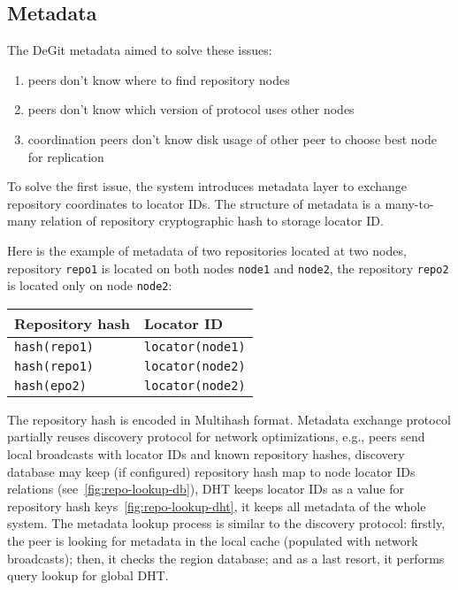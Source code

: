 \documentclass[acmlarge, screen, nonacm, 11pt]{acmart}
\newcommand{\code}[1]{\texttt{#1}}
\begin{document}
\subsection{Metadata}\label{sec:metadata}

The DeGit metadata aimed to solve these issues:
\begin{enumerate}
  \item peers don't know where to find repository nodes
  \item peers don't know which version of protocol uses other nodes
  \item coordination peers don't know disk usage of other peer to choose
    best node for replication
\end{enumerate}

To solve the first issue, the system introduces metadata layer to
exchange repository coordinates to locator IDs. The structure
of metadata is a many-to-many relation of
repository cryptographic hash to storage locator ID.

Here is the example of metadata of two repositories located at two nodes,
repository \code{repo1} is located on both nodes \code{node1} and \code{node2},
the repository \code{repo2} is located only on node \code{node2}:

\begin{tabular}{l | l}
  Repository hash & Locator ID \\ \hline
  \code{hash(repo1)} & \code{locator(node1)} \\
  \code{hash(repo1)} & \code{locator(node2)} \\
  \code{hash(epo2)} & \code{locator(node2)} \\
\end{tabular}

The repository hash is encoded in Multihash format. Metadata exchange
protocol partially reuses discovery protocol for network optimizations,
e.g., peers send local broadcasts with locator IDs and known
repository hashes, discovery database may keep (if configured)
repository hash map to node locator IDs relations (see~\ref{fig:repo-lookup-db}),
DHT keeps locator IDs as a value for repository hash keys~\ref{fig:repo-lookup-dht},
it keeps all metadata of the whole system.
The metadata lookup process is similar to the discovery protocol:
firstly, the peer is looking for metadata in the local cache
(populated with network broadcasts); then, it checks the region database;
and as a last resort, it performs query lookup for global DHT.
\end{document}

